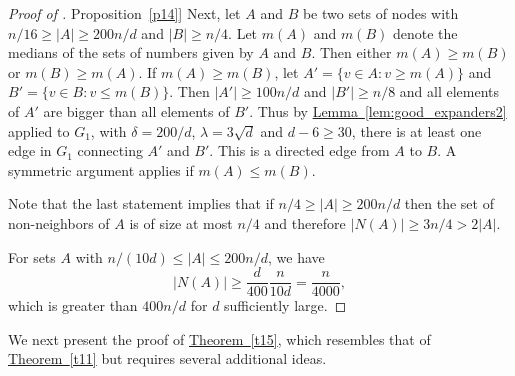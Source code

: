 \documentclass[11pt]{article}
\numberwithin{equation}{section}
\theoremstyle{definition}
\theoremstyle{plain}
\newcommand{\expref}[2]{\hyperref[#2]{#1~\ref{#2}}}
\begin{document}
\begin{proof}[Proof of \expref{Proposition}{p14}]
Next, let $A$ and $B$ be two sets of nodes with $n/16 \geq |A| \geq 200 n / d$
and $|B| \geq n/4$. Let $m(A)$ and $m(B)$ denote the medians of the sets of
numbers given by $A$ and $B$.  Then either $m(A) \geq m(B)$ or 
$m(B) \geq m(A)$. If  $m(A) \geq m(B)$, let $A' = \{ v \in A : v \geq m(A)\}$
and $B' = \{v \in B : v \leq m(B)\}$.
Then $|A'| \geq 100 n / d$ and $|B'| \geq n/8$ and all elements of $A'$ are
bigger than all elements of $B'$. 
Thus by \expref{Lemma}{lem:good_expanders2} applied to $G_1$, with
$\delta = 200/d$, 
$\lambda = 3 \sqrt{d}$ and $d-6 \geq 30$, 
there is at least one edge in 
 $G_1$ connecting $A'$ and $B'$. 
This is a directed edge from $A$ to $B$. A symmetric argument applies
if $m(A) \leq m(B)$. 

Note that the last statement implies that if $n/4 \geq |A| \geq 200 n / d$
then the set of non-neighbors of $A$ is of size at most $n/4$ and
therefore $|N(A)| \geq 3 n/4 > 2 |A|$. 

For sets $A$ with $n / (10d) \leq |A| \leq 200 n / d$, we have 
\[
|N(A)| \geq  \frac{d}{400} \frac{n}{10 d} = \frac{n}{4000},
\]
which is greater than $400 n / d$ for $d$ sufficiently large.  
%
\end{proof}
%
%

\noindent
We next present the proof of \expref{Theorem}{t15}, which resembles that of
\expref{Theorem}{t11} but requires several additional ideas.
\vspace{0.2cm}
\end{document}
